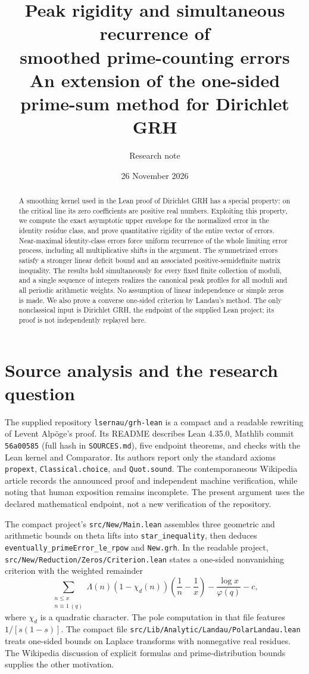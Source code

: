 \documentclass[11pt]{article}
\title{\textbf{Peak rigidity and simultaneous recurrence of\protect\\ smoothed prime-counting errors}\\[4pt]\large An extension of the one-sided prime-sum method for Dirichlet GRH}
\author{Research note}
\date{26 November 2026}
\theoremstyle{remark}\newtheorem{remark}[theorem]{Remark}
\begin{document}
\maketitle
\begin{abstract}
A smoothing kernel used in the Lean proof of Dirichlet GRH has a special property: on the critical line its zero coefficients are positive real numbers. Exploiting this property, we compute the exact asymptotic upper envelope for the normalized error in the identity residue class, and prove quantitative rigidity of the entire vector of errors. Near-maximal identity-class errors force uniform recurrence of the whole limiting error process, including all multiplicative shifts in the argument. The symmetrized errors satisfy a stronger linear deficit bound and an associated positive-semidefinite matrix inequality. The results hold simultaneously for every fixed finite collection of moduli, and a single sequence of integers realizes the canonical peak profiles for all moduli and all periodic arithmetic weights. No assumption of linear independence or simple zeros is made. We also prove a converse one-sided criterion by Landau's method. The only nonclassical input is Dirichlet GRH, the endpoint of the supplied Lean project; its proof is not independently replayed here.
\end{abstract}

\section{Source analysis and the research question}
The supplied repository \texttt{lsernau/grh-lean} \cite{repo} is a compact and a readable rewriting of Levent Alp\"oge's proof. Its README describes Lean 4.35.0, Mathlib commit \texttt{56a00585} (full hash in \texttt{SOURCES.md}), five endpoint theorems, and checks with the Lean kernel and Comparator. Its authors report only the standard axioms \texttt{propext}, \texttt{Classical.choice}, and \texttt{Quot.sound}. The contemporaneous Wikipedia article \cite{wiki} records the announced proof and independent machine verification, while noting that human exposition remains incomplete. The present argument uses the declared mathematical endpoint, not a new verification of the repository.

The compact project's \texttt{src/New/Main.lean} assembles three geometric and arithmetic bounds on theta lifts into \texttt{star\_inequality}, then deduces \texttt{eventually\_primeError\_le\_rpow} and \texttt{New.grh}. In the readable project, \texttt{src/New/Reduction/Zeros/Criterion.lean} states a one-sided nonvanishing criterion with the weighted remainder
\[
 \sum_{\substack{n\le x\\n\equiv1\ (q)}}\Lambda(n)(1-\chi_d(n))
       \left(\frac1n-\frac1x\right)-\frac{\log x}{\varphi(q)}-c,
\]
where $\chi_d$ is a quadratic character. The pole computation in that file features $1/[s(1-s)]$. The compact file \texttt{src/Lib/Analytic/Landau/PolarLandau.lean} treats one-sided bounds on Laplace transforms with nonnegative real residues. The Wikipedia discussion of explicit formulas and prime-distribution bounds supplies the other motivation.
\end{document}
